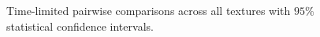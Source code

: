 \begin{figure}[t]
	\centering
	\caption[Time-limited pairwise comparisons across all textures]{Time-limited pairwise comparisons across all textures with $95\%$ statistical confidence intervals.}
	\label{fig:pairwise_alltextures}
\end{figure}

